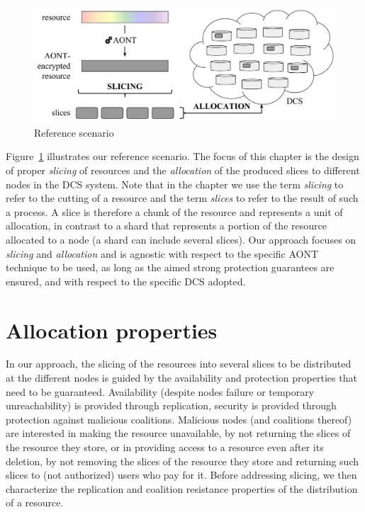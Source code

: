 \begin{figure}
	\begin{center}
		\includegraphics[width=\textwidth]{figures/bdfprs-fig02.pdf}
	\end{center}
	\caption{\label{dcs:fig:scenario}Reference scenario}
\end{figure}

Figure~\ref{dcs:fig:scenario} illustrates our reference scenario.  The
focus of this chapter is the design of proper {\em slicing\/} of
resources and the {\em allocation\/} of the produced slices to
different nodes in the DCS system.  Note that in the chapter we use the
term {\em slicing\/} to refer to the cutting of a resource and the
term {\em slices\/} to refer to the result of such a process.  A slice
is therefore a chunk of the resource and represents a unit of
allocation, in contrast to a shard that represents a portion of the
resource allocated to a node (a shard can include several slices).
Our approach focuses on {\em slicing\/} and {\em allocation\/} and is
agnostic with respect to the specific AONT technique to be used, as
long as the aimed strong protection guarantees are ensured, and with
respect to the specific DCS adopted.




\section{Allocation properties}\label{dcs:sec:allocation}

In our approach, the slicing of the resources into several slices to
be distributed at the different nodes is guided by the availability
and protection properties that need to be guaranteed.  Availability
(despite nodes failure or temporary unreachability) is provided
through replication, security is provided through protection against
malicious coalitions. Malicious nodes (and coalitions thereof) are
interested in making the resource unavailable, by not returning the
slices of the resource they store, or in providing access to a
resource even after its deletion, by not removing the slices of the
resource they store and returning such slices to (not authorized)
users who pay for it.  Before addressing slicing, we then characterize
the replication and coalition resistance properties of the
distribution of a resource.

